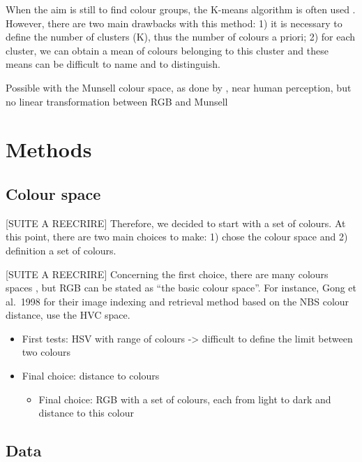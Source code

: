 \documentclass[11pt,a4paper]{article}
\begin{document}
When the aim is still to find colour groups, the
K-means algorithm is often used \cite[see e.g.][]{yendrikhovskij2001,konyushkova2015,hulee2007}. However, there are two main
drawbacks with this method: 1) it is necessary to define the number of
clusters (K), thus the number of colours a priori; 2) for each cluster,
we can obtain a mean of colours belonging to this cluster and these
means can be difficult to name and to distinguish.

Possible with the Munsell colour space, as done by \citet{kimbaelee2007}, near human perception, but no linear transformation between
RGB and Munsell \cite[see e.g.][]{zhangsokhansanjwuetal1998}

\section{Methods}\label{methods}

\subsection{Colour space}

{[}SUITE A REECRIRE{]} Therefore, we decided to start with a set of
colours. At this point, there are two main choices to make: 1) chose the
colour space and 2) definition a set of colours.

{[}SUITE A REECRIRE{]} Concerning the first choice, there are many
colours spaces \cite{tkalcictasic2003}, but RGB can be stated as ``the basic colour space''. For instance, Gong et al.~1998
for their image indexing and retrieval method based on the NBS colour
distance, use the HVC space.

\begin{itemize}
	
	\item
	First tests: HSV with range of colours -\textgreater{} difficult to
	define the limit between two colours
	\item
	Final choice: distance to colours
	
	\begin{itemize}
		\item
		Final choice: RGB with a set of colours, each from light to dark and
		distance to this colour
	\end{itemize}
\end{itemize}



\subsection{Data}
\end{document}
